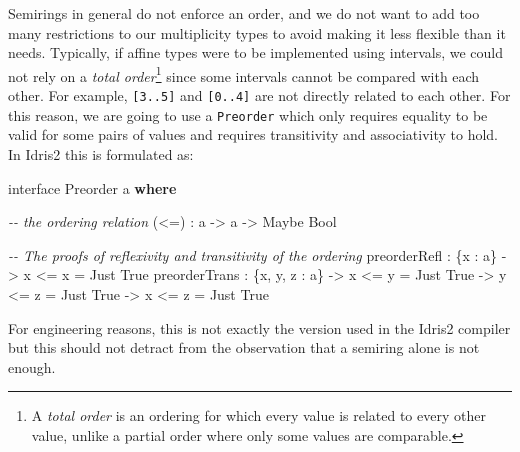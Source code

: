 \documentclass[
]{article}
\newenvironment{Shaded}{}{}
\newcommand{\CommentTok}[1]{\textcolor[rgb]{0.38,0.63,0.69}{\textit{#1}}}
\newcommand{\DataTypeTok}[1]{\textcolor[rgb]{0.56,0.13,0.00}{#1}}
\newcommand{\KeywordTok}[1]{\textcolor[rgb]{0.00,0.44,0.13}{\textbf{#1}}}
\newcommand{\NormalTok}[1]{#1}
\newcommand{\OperatorTok}[1]{\textcolor[rgb]{0.40,0.40,0.40}{#1}}
\newcommand{\OtherTok}[1]{\textcolor[rgb]{0.00,0.44,0.13}{#1}}
\begin{document}
Semirings in general do not enforce an order, and we do not want to add
too many restrictions to our multiplicity types to avoid making it less
flexible than it needs. Typically, if affine types were to be
implemented using intervals, we could not rely on a \emph{total
order}\footnote{A \emph{total order} is an ordering for which every
  value is related to every other value, unlike a partial order where
  only some values are comparable.} since some intervals cannot be
compared with each other. For example, \texttt{{[}3..5{]}} and
\texttt{{[}0..4{]}} are not directly related to each other. For this
reason, we are going to use a \texttt{Preorder} which only requires
equality to be valid for some pairs of values and requires transitivity
and associativity to hold. In Idris2 this is formulated as:

\begin{Shaded}
\begin{Highlighting}[]
\NormalTok{interface }\DataTypeTok{Preorder}\NormalTok{ a }\KeywordTok{where}

  \CommentTok{{-}{-} the ordering relation}
\NormalTok{  (}\OperatorTok{\textless{}=}\NormalTok{) }\OperatorTok{:}\NormalTok{ a }\OtherTok{{-}\textgreater{}}\NormalTok{ a }\OtherTok{{-}\textgreater{}} \DataTypeTok{Maybe} \DataTypeTok{Bool}

  \CommentTok{{-}{-} The proofs of reflexivity and transitivity of the ordering}
\NormalTok{  preorderRefl }\OperatorTok{:}\NormalTok{ \{x }\OperatorTok{:}\NormalTok{ a\} }\OtherTok{{-}\textgreater{}}\NormalTok{ x }\OperatorTok{\textless{}=}\NormalTok{ x }\OtherTok{=} \DataTypeTok{Just} \DataTypeTok{True}
\NormalTok{  preorderTrans }\OperatorTok{:}\NormalTok{ \{x, y, z }\OperatorTok{:}\NormalTok{ a\} }\OtherTok{{-}\textgreater{}}\NormalTok{ x }\OperatorTok{\textless{}=}\NormalTok{ y }\OtherTok{=} \DataTypeTok{Just} \DataTypeTok{True} 
                                \OtherTok{{-}\textgreater{}}\NormalTok{ y }\OperatorTok{\textless{}=}\NormalTok{ z }\OtherTok{=} \DataTypeTok{Just} \DataTypeTok{True} 
                                \OtherTok{{-}\textgreater{}}\NormalTok{ x }\OperatorTok{\textless{}=}\NormalTok{ z }\OtherTok{=} \DataTypeTok{Just} \DataTypeTok{True}
\end{Highlighting}
\end{Shaded}

For engineering reasons, this is not exactly the version used in the
Idris2 compiler but this should not detract from the observation that a
semiring alone is not enough.
\end{document}
